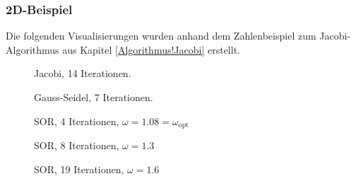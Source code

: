\begin{refsection}
\subsubsection{2D-Beispiel}
Die folgenden Visualisierungen wurden anhand dem Zahlenbeispiel zum
Jacobi-Algorithmus aus Kapitel \ref{Algorithmus!Jacobi} erstellt.
\begin{figure}[!ht]\centering
\caption{Jacobi, 14 Iterationen.}
\label{fig:Jac. 2D Bsp}
\end{figure}
\begin{figure}[!ht]\centering
\caption{Gauss-Seidel, 7 Iterationen.}
\label{fig:G.-S. 2D Bsp}
\end{figure}
\begin{figure}[!ht]\centering
\caption{SOR, 4 Iterationen, $\omega=1.08=\omega_{\text{opt}}$}
\label{fig:SOR w=1.08= 2D Bsp}
\end{figure}

\begin{figure}[!ht]\centering
\caption{SOR, 8 Iterationen, $\omega=1.3$}
\label{fig:SOR w=1.3 2D Bsp}
\end{figure}
\begin{figure}[!ht]\centering
\caption{SOR, 19 Iterationen, $\omega=1.6$}
\label{fig:SOR w=1.6 2D Bsp}
\end{figure}
	

\end{refsection}
